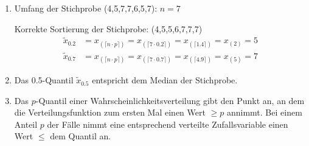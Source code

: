 \documentclass[a4paper]{scrartcl}
\def \blattnr {6}
\begin{document}
\begin{enumerate}[label=\bfseries \blattnr.\arabic*]
\begin{enumerate}
 \item
    Umfang der Stichprobe (4,5,7,7,6,5,7): $n=7$

    Korrekte Sortierung der Stichprobe: (4,5,5,6,7,7,7)
    \begin{align*}
        \tilde x_{\num{0.2}}
        &= x_{(\lceil n \cdot p \rceil)}
        = x_{(\lceil 7 \cdot 0.2 \rceil)}
        = x_{(\lceil 1.4 \rceil)}
        = x_{(2)} = 5 \\
        \tilde x_{0.7}
        &= x_{(\lceil n \cdot p \rceil)}
        = x_{(\lceil 7 \cdot 0.7 \rceil)}
        = x_{(\lceil 4.9 \rceil)}
        = x_{(5)} = 7
    \end{align*}

 \item
     Das \num{0,5}-Quantil $\tilde x_{\num{0,5}}$ entspricht dem Median der Stichprobe.


    \item
        Das $p$-Quantil einer Wahrscheinlichkeitsverteilung gibt den Punkt an,
        an dem die Verteilungsfunktion zum ersten Mal einen Wert $\geq p$
        annimmt.
        Bei einem Anteil $p$ der Fälle nimmt eine entsprechend verteilte
        Zufallsvariable einen Wert $\leq$ dem Quantil an.


\end{enumerate}
\end{enumerate}
\end{document}
